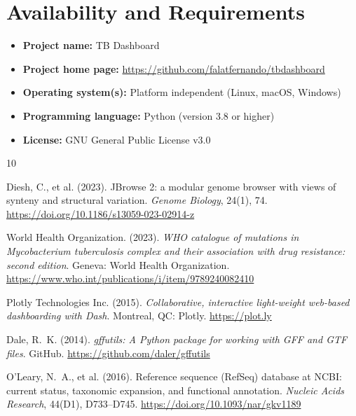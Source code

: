 \documentclass{article}
\begin{document}
\section{Availability and Requirements}
\begin{itemize}
    \item \textbf{Project name:} TB Dashboard
    \item \textbf{Project home page:} \url{https://github.com/falatfernando/tbdashboard}
    \item \textbf{Operating system(s):} Platform independent (Linux, macOS, Windows)
    \item \textbf{Programming language:} Python (version 3.8 or higher)
    \item \textbf{License:} GNU General Public License v3.0
\end{itemize}

\begin{thebibliography}{10}

Diesh, C., et al. (2023).
\newblock JBrowse 2: a modular genome browser with views of synteny and structural variation.
\newblock \emph{Genome Biology}, 24(1), 74.
\newblock \url{https://doi.org/10.1186/s13059-023-02914-z}

World Health Organization. (2023).
\newblock \emph{WHO catalogue of mutations in Mycobacterium tuberculosis complex and their association with drug resistance: second edition}.
\newblock Geneva: World Health Organization.
\newblock \url{https://www.who.int/publications/i/item/9789240082410}

Plotly Technologies Inc. (2015).
\newblock \emph{Collaborative, interactive light-weight web-based dashboarding with Dash}.
\newblock Montreal, QC: Plotly.
\newblock \url{https://plot.ly}

Dale, R.~K. (2014).
\newblock \emph{gffutils: A Python package for working with GFF and GTF files}.
\newblock GitHub.
\newblock \url{https://github.com/daler/gffutils}

O'Leary, N.~A., et al. (2016).
\newblock Reference sequence (RefSeq) database at NCBI: current status, taxonomic expansion, and functional annotation.
\newblock \emph{Nucleic Acids Research}, 44(D1), D733--D745.
\newblock \url{https://doi.org/10.1093/nar/gkv1189}

\end{thebibliography}
\end{document}
